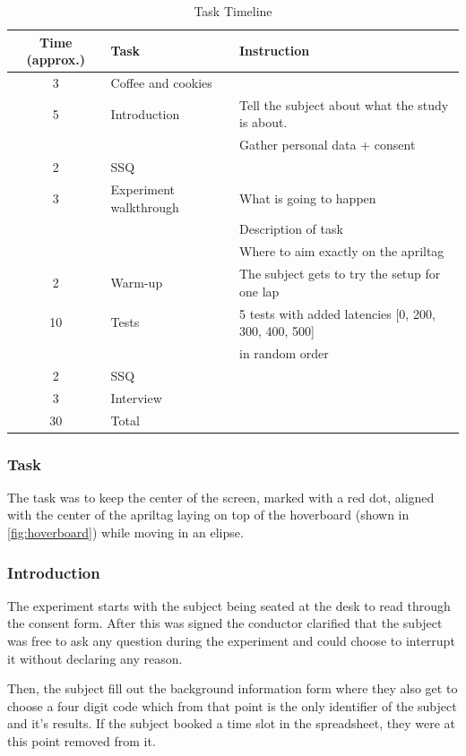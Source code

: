 \documentclass[nofilelist]{cslthse-msc}
\begin{document}
\begin{table}[ht]
   \centering
   \caption{Task Timeline}
   \label{tab:task-timeline}
   \begin{tabular}{|c|l|l|}
   \hline
   \textbf{Time (approx.)} & \textbf{Task} & \textbf{Instruction} \\ \hline
   3 & Coffee and cookies & \\ \hline
   5 & Introduction & Tell the subject about what the study is about. \\
   & & Gather personal data + consent \\ \hline
   2 & SSQ & \\ \hline
   3 & Experiment walkthrough & What is going to happen \\
   & & Description of task \\
   & & Where to aim exactly on the apriltag \\ \hline
   2 & Warm-up & The subject gets to try the setup for one lap \\ \hline
   10 & Tests & 5 tests with added latencies [0, 200, 300, 400, 500] \\ 
   & & in random order \\ \hline
   2 & SSQ & \\ \hline
   3 & Interview & \\ \hline
   30 & Total & \\ \hline
   \end{tabular}
\end{table}

\subsubsection{Task}
The task was to keep the center of the screen, marked with a red dot, aligned with the center of the apriltag laying on top of the hoverboard (shown in \ref{fig:hoverboard}) while moving in an elipse.

\subsubsection{Introduction}
The experiment starts with the subject being seated at the desk to read through the consent form. After this was signed the conductor clarified that the subject was free to ask any question during the experiment and could choose to interrupt it without declaring any reason. 

Then, the subject fill out the background information form where they also get to choose a four digit code which from that point is the only identifier of the subject and it's results. If the subject booked a time slot in the spreadsheet, they were at this point removed from it.
\end{document}
